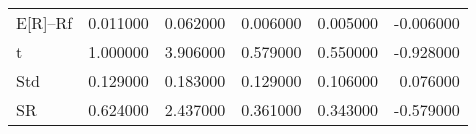 \begin{tabular}{lrrrrr}
\toprule
\midrule
E[R]--Rf & 0.011000 & 0.062000 & 0.006000 & 0.005000 & -0.006000 \\
t & 1.000000 & 3.906000 & 0.579000 & 0.550000 & -0.928000 \\
Std & 0.129000 & 0.183000 & 0.129000 & 0.106000 & 0.076000 \\
SR & 0.624000 & 2.437000 & 0.361000 & 0.343000 & -0.579000 \\
\bottomrule
\end{tabular}
